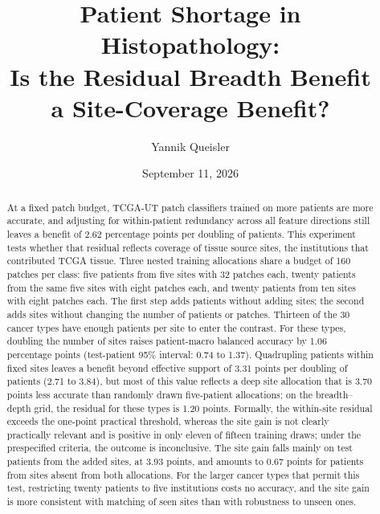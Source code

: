 \documentclass[11pt]{article}
\title{Patient Shortage in Histopathology:\\Is the Residual Breadth Benefit\\a Site-Coverage Benefit?}
\author{Yannik Queisler}
\date{September 11, 2026}
\begin{document}
\raggedbottom
{}
\setlength{\emergencystretch}{2em}
\maketitle
\begin{abstract}
\noindent At a fixed patch budget, TCGA-UT patch classifiers trained on more patients are more accurate, and adjusting for within-patient redundancy across all feature directions still leaves a benefit of 2.62 percentage points per doubling of patients. This experiment tests whether that residual reflects coverage of tissue source sites, the institutions that contributed TCGA tissue. Three nested training allocations share a budget of 160 patches per class: five patients from five sites with 32 patches each, twenty patients from the same five sites with eight patches each, and twenty patients from ten sites with eight patches each. The first step adds patients without adding sites; the second adds sites without changing the number of patients or patches. Thirteen of the 30 cancer types have enough patients per site to enter the contrast. For these types, doubling the number of sites raises patient-macro balanced accuracy by 1.06 percentage points (test-patient 95\% interval: 0.74 to 1.37). Quadrupling patients within fixed sites leaves a benefit beyond effective support of 3.31 points per doubling of patients (2.71 to 3.84), but most of this value reflects a deep site allocation that is 3.70 points less accurate than randomly drawn five-patient allocations; on the breadth--depth grid, the residual for these types is 1.20 points. Formally, the within-site residual exceeds the one-point practical threshold, whereas the site gain is not clearly practically relevant and is positive in only eleven of fifteen training draws; under the prespecified criteria, the outcome is inconclusive. The site gain falls mainly on test patients from the added sites, at 3.93 points, and amounts to 0.67 points for patients from sites absent from both allocations. For the larger cancer types that permit this test, restricting twenty patients to five institutions costs no accuracy, and the site gain is more consistent with matching of seen sites than with robustness to unseen ones.
\end{abstract}
\setcounter{tocdepth}{1}
\tableofcontents
\clearpage
\end{document}
